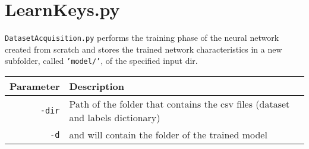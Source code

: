 \section{LearnKeys.py}
\texttt{DatasetAcquisition.py} performs the training phase of the neural network created from scratch and stores the trained network characteristics in a new subfolder, called \texttt{'model/'}, of the specified input dir.

\begin{table}[h]
\centering\footnotesize
\begin{tabular}{rl}
\hline
\textbf{Parameter} & \textbf{Description}\\
\hline
\texttt{-dir} & Path of the folder that contains the csv files (dataset and labels dictionary)\\
\texttt{-d} & and will contain the folder of the trained model\\
\hline
\end{tabular}
\end{table}
